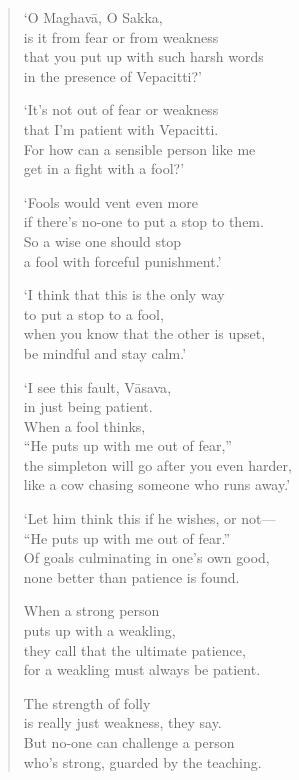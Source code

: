 \documentclass[12pt,openany]{book}%
\begin{document}
\begin{verse}%
‘O \textsanskrit{Maghavā}, O Sakka, \\
is it from fear or from weakness \\
that you put up with such harsh words \\
in the presence of Vepacitti?’ 

‘It’s not out of fear or weakness \\
that I’m patient with Vepacitti. \\
For how can a sensible person like me \\
get in a fight with a fool?’ 

‘Fools would vent even more \\
if there’s no-one to put a stop to them. \\
So a wise one should stop \\
a fool with forceful punishment.’ 

‘I think that this is the only way \\
to put a stop to a fool, \\
when you know that the other is upset, \\
be mindful and stay calm.’ 

‘I see this fault, \textsanskrit{Vāsava}, \\
in just being patient. \\
When a fool thinks, \\
“He puts up with me out of fear,” \\
the simpleton will go after you even harder, \\
like a cow chasing someone who runs away.’ 

‘Let him think this if he wishes, or not—\\
“He puts up with me out of fear.” \\
Of goals culminating in one’s own good, \\
none better than patience is found. 

When a strong person \\
puts up with a weakling, \\
they call that the ultimate patience, \\
for a weakling must always be patient. 

The strength of folly \\
is really just weakness, they say. \\
But no-one can challenge a person \\
who’s strong, guarded by the teaching. 


\end{verse}
\end{document}
